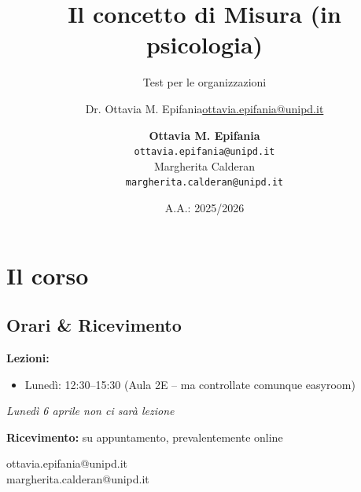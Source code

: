 \documentclass[compress]{beamer}
\title[Misura in $\psi$]{Il concetto di Misura (in psicologia)}
\subtitle{Test per le organizzazioni}
\date{A.A.: 2025/2026}
\author[Ottavia Epifania]{\texorpdfstring{Dr. Ottavia M. Epifania\newline\url{ottavia.epifania@unipd.it}}{Author}}
\institute[]{Università di Padova}
\author{\textbf{Ottavia M. Epifania}\\\texttt{ottavia.epifania@unipd.it}\\
Margherita Calderan\\\texttt{margherita.calderan@unipd.it}}
\begin{document}
\begin{frame}[plain]
\maketitle
\end{frame}

\section{Il corso}

\subsection*{Orari \& Ricevimento}
\begin{frame}

\textbf{Lezioni:}
\begin{itemize}
    \item Lunedì: 12:30--15:30 (Aula 2E -- ma controllate comunque easyroom)
\end{itemize}

\vspace{0.3cm}

\textit{Lunedì 6 aprile non ci sarà lezione}

\vspace{0.5cm}

\textbf{Ricevimento:} su appuntamento, prevalentemente online

\vspace{0.5cm}

\begin{center}
ottavia.epifania@unipd.it \\
margherita.calderan@unipd.it
\end{center}

\end{frame}

\end{document}
